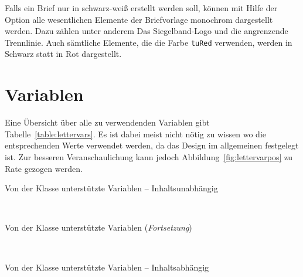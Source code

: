 Falls ein Brief nur in schwarz-weiß erstellt werden soll, können mit Hilfe
der Option  alle wesentlichen Elemente der Briefvorlage monochrom
dargestellt werden. Dazu zählen unter anderem Das Siegelband-Logo und die
angrenzende Trennlinie.
Auch sämtliche Elemente, die die Farbe \texttt{tuRed} verwenden, werden
in Schwarz statt in Rot dargestellt.

\section{Variablen}\label{sec:lettervars}

Eine Übersicht über alle zu verwendenden Variablen gibt
Tabelle~\ref{table:lettervars}. Es ist dabei meist nicht nötig zu wissen
wo die entsprechenden Werte verwendet werden, da das Design im allgemeinen
festgelegt ist. Zur besseren Veranschaulichung kann jedoch
Abbildung~\ref{fig:lettervarpos} zu Rate gezogen werden.

\begin{desctable}
  \caption{Von der Klasse  unterstützte
    Variablen -- Inhaltsunabhängig}\label{table:lettervars}\\
  \Endfirsthead
  \caption[]{Von der Klasse  unterstützte Variablen
    (\emph{Fortsetzung})}\\
  \Endhead%
  \standardfoot%
\end{desctable}

\begin{desctable}
  \caption{Von der Klasse  unterstützte
    Variablen -- Inhaltsabhängig}\label{table:lettervars}\\
  \Endfirsthead
\end{desctable}


